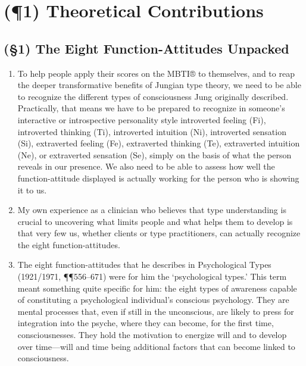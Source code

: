 

\section{(\P1) Theoretical Contributions}

\subsection{(\S1) The Eight Function-Attitudes Unpacked}

\begin{enumerate}

    \item {} To help people apply their
        scores on the MBTI® to themselves, and to reap the deeper
        transformative benefits of Jungian type theory, we need to be able to
        recognize the different types of consciousness Jung originally
        described. Practically, that means we have to be prepared to recognize
        in someone’s interactive or introspective personality style introverted
        feeling (Fi), introverted thinking (Ti), introverted intuition (Ni),
        introverted sensation (Si), extraverted feeling (Fe), extraverted
        thinking (Te), extraverted intuition (Ne), or extraverted sensation
        (Se), simply on the basis of what the person reveals in our presence.
        We also need to be able to assess how well the function-attitude
        displayed is actually working for the person who is showing it to us.

    \item {} My own experience as a
        clinician who believes that type understanding is crucial to uncovering
        what limits people and what helps them to develop is that very few us,
        whether clients or type practitioners, can actually recognize the eight
        function-attitudes.

    \item {} The eight function-attitudes
        that he describes in Psychological Types (1921/1971, ¶¶556–671) were
        for him the ‘psychological types.’ This term meant something quite
        specific for him: the eight types of awareness capable of constituting
        a psychological individual’s conscious psychology. They are mental
        processes that, even if still in the unconscious, are likely to press
        for integration into the psyche, where they can become, for the first
        time, consciousnesses. They hold the motivation to energize will and to
        develop over time—will and time being additional factors that can
        become linked to consciousness.

\end{enumerate}

